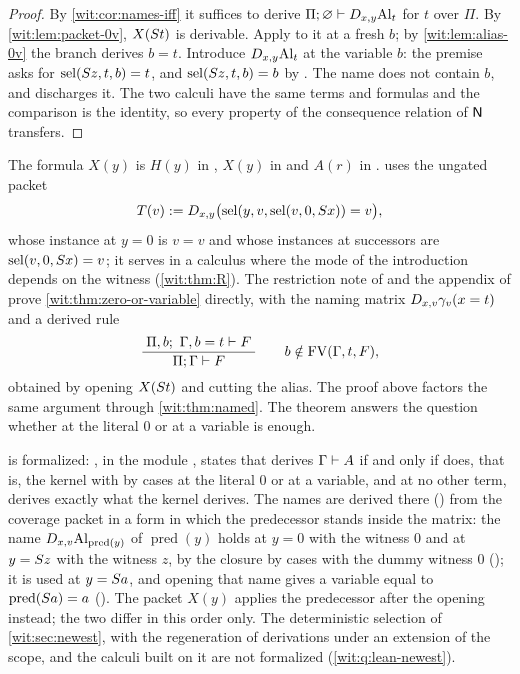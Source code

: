 \begin{proof}
By \cref{wit:cor:names-iff} it suffices to derive
$\Pi;\varnothing\vdash D_{x,y}\mathrm{Al}_t$ for $t$ over $\Pi$.  By
\cref{wit:lem:packet-0v}, $X(S t)$ is derivable.  Apply  to
it at a fresh $b$; by \cref{wit:lem:alias-0v} the branch derives $b=t$.
Introduce $D_{x,y}\mathrm{Al}_t$ at the variable $b$: the premise asks for
$\operatorname{sel}(S z,t,b)=t$, and $\operatorname{sel}(S z,t,b)=b$ by .  The name
does not contain $b$, and  discharges it.  The two calculi have
the same terms and formulas and the comparison is the identity, so every
property of the consequence relation of $\mathsf{N}$ transfers.
\end{proof}

\begin{remark}
\label{wit:rem:packet-versions}
The formula $X(y)$ is $H(y)$ in , $X(y)$ in
 and $A(r)$ in .
 uses the ungated packet
\[
 T(v)\mathrel{:=}D_{x,y}\bigl(\operatorname{sel}(y,v,\operatorname{sel}(v,0,S x))=v\bigr),
\]
whose instance at $y=0$ is $v=v$ and whose instances at successors are
$\operatorname{sel}(v,0,S x)=v$; it serves in a calculus where the mode of the
introduction depends on the witness (\cref{wit:thm:R}).  The restriction
note of  and the appendix of  prove
\cref{wit:thm:zero-or-variable} directly, with the naming matrix
$D_{x,v}\gamma_v(x=t)$ and a derived rule
\[
 \dfrac{\;\Pi,b;\ \Gamma,b=t\vdash F\;}{\;\Pi;\Gamma\vdash F\;}\qquad
 b\notin\operatorname{FV}(\Gamma,t,F),
\]
obtained by opening $X(S t)$ and cutting the alias.  The proof above
factors the same argument through \cref{wit:thm:named}.  The theorem
answers the question whether  at the literal $0$ or at a
variable is enough.
\end{remark}

\begin{remark}
\label{wit:rem:lean-complete}
 is formalized:
, in the module , states
that  derives $\Gamma\vdash A$ if and only if
 does, that is, the kernel with  by cases at the
literal $0$ or at a variable, and at no other term, derives exactly what
the kernel derives.  The names are derived there () from
the coverage packet in a form in which the predecessor
stands inside the matrix: the name
$D_{x,v}\mathrm{Al}_{\operatorname{pred}(y)}$ of
$\operatorname{pred}(y)$ holds at $y=0$ with the witness $0$ and at
$y=S z$ with the witness $z$, by the closure by cases with the dummy
witness $0$ (); it is used at $y=S a$, and opening
that name gives a variable equal to $\operatorname{pred}(S a)=a$
().  The packet $X(y)$ applies the predecessor after the
opening instead; the two differ in this order only.  The deterministic
selection of \cref{wit:sec:newest}, with the regeneration of derivations
under an extension of the scope, and the calculi built on it are not
formalized (\cref{wit:q:lean-newest}).
\end{remark}

